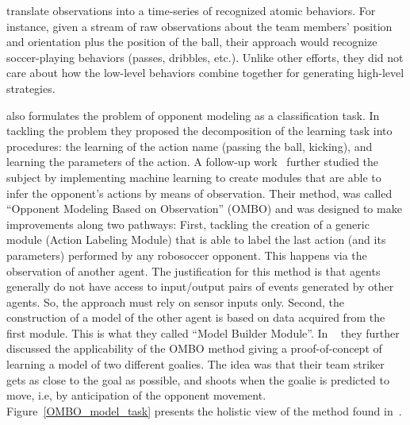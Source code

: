\cite{kaminka_learning_2003} translate observations into a time-series of recognized atomic behaviors. For instance, given a stream of raw observations about the team members' position and orientation plus the position of the ball, their approach would recognize soccer-playing behaviors (passes, dribbles, etc.). Unlike other efforts, they did not care about how the low-level behaviors combine together for generating high-level strategies.  

\cite{ledezma_predicting_2002} also formulates the problem of opponent modeling as a classification task. In tackling the problem they proposed the decomposition of the learning task into procedures: the learning of the action name (passing the ball, kicking), and learning the parameters of the action. A follow-up work~\citep{ledezma_predicting_2005} further studied the subject by implementing machine learning to create modules that are able to infer the opponent's actions by means of observation. Their method, was called ``Opponent Modeling Based on Observation'' (OMBO) and was designed to make improvements along two pathways: First, tackling the creation of a generic module (Action Labeling Module) that is able to label the last action (and its parameters) performed by any robosoccer opponent. This happens via the observation of another agent. The justification for this method is that agents generally do not have access to input/output pairs of events generated by other agents. So, the approach must rely on sensor inputs only. Second, the construction of a model of the other agent is based on data acquired from the first module. This is what they called ``Model Builder Module''. In ~\cite{ledezma_ombo:_2009} they further discussed the applicability of the OMBO method giving a proof-of-concept of learning a model of two different goalies. The idea was that their team striker gets as close to the goal as possible, and shoots when the goalie is predicted to move, i.e, by anticipation of the opponent movement. Figure~\ref{OMBO_model_task} presents the holistic view of the method found in~\cite{ledezma_predicting_2005,ledezma_ombo:_2009}. 

